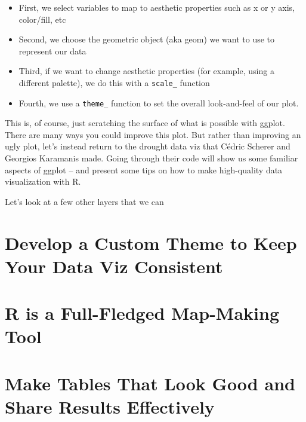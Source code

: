 \documentclass[
]{book}
\providecommand{\tightlist}{%
  \setlength{\itemsep}{0pt}\setlength{\parskip}{0pt}}
\begin{document}
\begin{itemize}
\tightlist
\item
  First, we select variables to map to aesthetic properties such as x or y axis, color/fill, etc
\item
  Second, we choose the geometric object (aka geom) we want to use to represent our data
\item
  Third, if we want to change aesthetic properties (for example, using a different palette), we do this with a \texttt{scale\_} function
\item
  Fourth, we use a \texttt{theme\_} function to set the overall look-and-feel of our plot.
\end{itemize}

This is, of course, just scratching the surface of what is possible with ggplot. There are many ways you could improve this plot. But rather than improving an ugly plot, let's instead return to the drought data viz that Cédric Scherer and Georgios Karamanis made. Going through their code will show us some familiar aspects of ggplot -- and present some tips on how to make high-quality data visualization with R.

Let's look at a few other layers that we can

\hypertarget{develop-a-custom-theme-to-keep-your-data-viz-consistent}{%
\chapter*{Develop a Custom Theme to Keep Your Data Viz Consistent}\label{develop-a-custom-theme-to-keep-your-data-viz-consistent}}

\hypertarget{r-is-a-full-fledged-map-making-tool}{%
\chapter*{R is a Full-Fledged Map-Making Tool}\label{r-is-a-full-fledged-map-making-tool}}

\hypertarget{make-tables-that-look-good-and-share-results-effectively}{%
\chapter*{Make Tables That Look Good and Share Results Effectively}\label{make-tables-that-look-good-and-share-results-effectively}}
\end{document}
